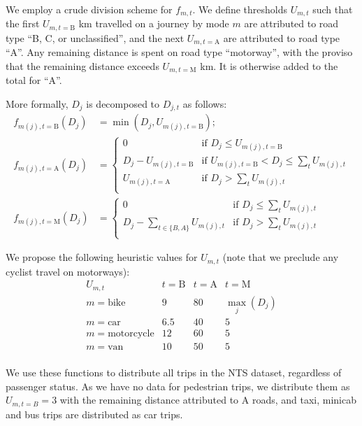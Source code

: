 \documentclass{article}
\begin{document}
We employ a crude division scheme for $f_{m,t}$. We define thresholds $U_{m,t}$ such that the first $U_{m,t=\text{B}}$ km travelled on a journey by mode $m$ are attributed to road type ``B, C, or unclassified'', and the next $U_{m,t=\text{A}}$ are attributed to road type ``A''. Any remaining distance is spent on road type ``motorway'', with the proviso that the remaining distance exceeds $U_{m,t=\text{M}}$ km. It is otherwise added to the total for ``A''. 

More formally, $D_j$ is decomposed to $D_{j,t}$ as follows:
\begin{align}
f_{m(j),t=\text{B}}(D_{j}) &= \min\left(D_j,U_{m(j),t=\text{B}}\right); \\
f_{m(j),t=\text{A}}(D_{j}) &=\left\{\begin{array}{lr} 
0 & \text{if } D_j\leq U_{m(j),t=\text{B}} \\
D_j-U_{m(j),t=\text{B}} & \text{if } U_{m(j),t=\text{B}}< D_{j}\leq\sum_tU_{m(j),t}\\
U_{m(j),t=\text{A}} & \text{if } D_{j}>\sum_tU_{m(j),t} \\
\end{array}\right.\\
f_{m(j),t=\text{M}}(D_{j}) &=\left\{\begin{array}{lr} 
0 & \text{if } D_j\leq \sum_tU_{m(j),t} \\
D_j-\sum_{t\in\{B,A\}}U_{m(j),t} & \text{if } D_{j}>\sum_tU_{m(j),t} \\
\end{array}\right.
\end{align}

We propose the following heuristic values for $U_{m,t}$ (note that we preclude any cyclist travel on motorways):
\begin{equation}\begin{array}{r|ccc}
U_{m,t} & t=\text{B}&t=\text{A} &t=\text{M} \\
\hline
m=\text{bike} & 9 & 80 & \max_j(D_j) \\
m=\text{car} & 6.5 & 40 & 5 \\
m=\text{motorcycle} & 12 & 60 & 5 \\
m=\text{van} & 10 & 50 & 5 \\
\end{array}\end{equation}

We use these functions to distribute all trips in the NTS dataset, regardless of passenger status. As we have no data for pedestrian trips, we distribute them as $U_{m,t=B}=3$ with the remaining distance attributed to A roads, and taxi, minicab and bus trips are distributed as car trips.
\end{document}
